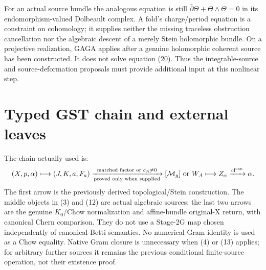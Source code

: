 \documentclass[11pt]{article}
\begin{document}
For an actual source bundle the analogous equation is still
$\bar\partial\Theta+\Theta\wedge\Theta=0$ in its endomorphism-valued
Dolbeault complex. A fold's charge/period equation is a constraint on
cohomology; it supplies neither the missing traceless obstruction
cancellation nor the algebraic descent of a merely Stein holomorphic
bundle. On a projective realization, GAGA applies after a genuine
holomorphic coherent source has been constructed. It does not solve
equation (20). Thus the integrable-source and source-deformation proposals
must provide additional input at this nonlinear step.

\section{Typed GST chain and external leaves}
The chain actually used is:
\[
 (X,p,\alpha)\longmapsto(J,K,a,F_a)
 \xrightarrow[\text{proved only when supplied}]{\text{matched factor or }c_A\ne0}
 [\mathcal M_g]\text{ or }W_A
 \longmapsto Z_\alpha\xrightarrow{\operatorname{cl}^{\rm can}}\alpha.
\]
The first arrow is the previously derived topological/Stein construction.
The middle objects in (3) and (12) are actual algebraic sources; the last
two arrows are the genuine $K_0$/Chow normalization and affine-bundle
original-X return, with canonical Chern comparison. They do not use a
Stage-2G map chosen independently of canonical Betti semantics. No numerical
Gram identity is used as a Chow equality. Native Gram closure is unnecessary
when (4) or (13) applies; for arbitrary further sources it remains the
previous conditional finite-source operation, not their existence proof.
\end{document}
